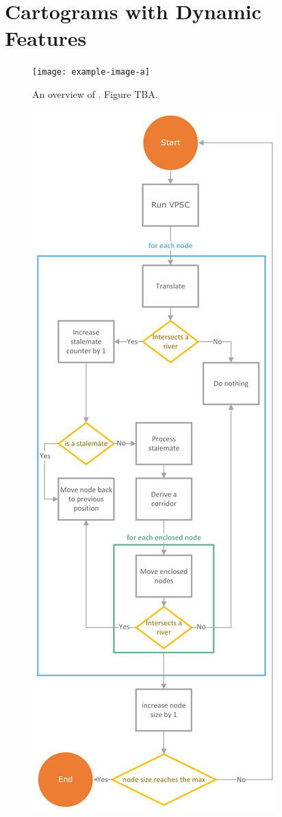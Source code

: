 \section{Cartograms with Dynamic Features}

{
\begin{figure}[tb!]
    \centering
    \texttt{[image: example-image-a]}
    \caption{An overview of \software. Figure TBA.}
    \label{fig:overview}
\end{figure}
}

{
\begin{figure}[tb!]
    \centering
    \includegraphics[width=\columnwidth]{figure/flowchart.png}

\end{figure}}
